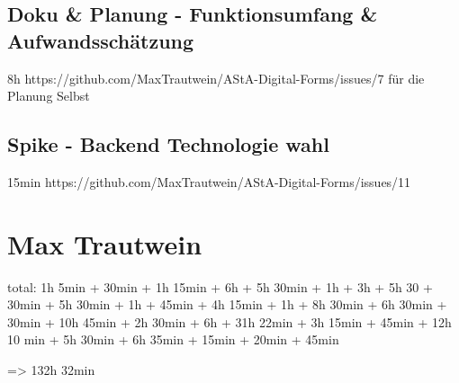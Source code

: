 \subsection{Doku & Planung - Funktionsumfang & Aufwandsschätzung}
8h
https://github.com/MaxTrautwein/AStA-Digital-Forms/issues/7
für die Planung Selbst

\subsection{Spike - Backend Technologie wahl }
15min
https://github.com/MaxTrautwein/AStA-Digital-Forms/issues/11

\section{Max Trautwein}\label{sec:max-trautwein}

total: 1h 5min + 30min + 1h 15min + 6h + 5h 30min + 1h + 3h + 5h 30 + 30min + 5h 30min + 1h + 45min + 4h 15min + 1h
+ 8h 30min + 6h 30min + 30min + 10h 45min + 2h 30min + 6h + 31h 22min + 3h 15min + 45min + 12h 10 min + 5h 30min + 6h 35min
+ 15min + 20min + 45min

=> 132h 32min

